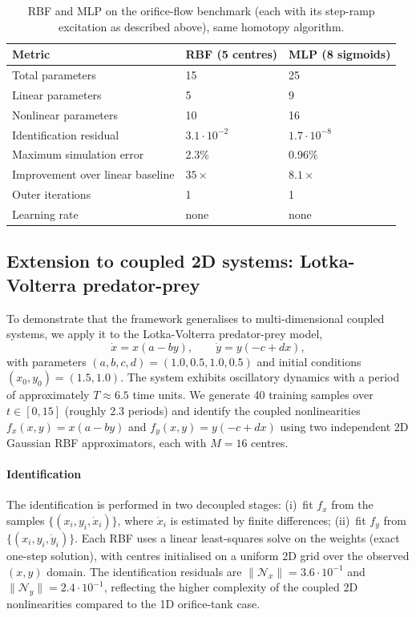 \documentclass[preprint,12pt,numbers]{elsarticle}
\begin{document}
\begin{table}[h]
\centering
\caption{RBF and MLP on the orifice-flow benchmark (each with its
step-ramp excitation as described above), same homotopy algorithm.}
\label{tab:comparison}
\begin{tabular}{L{5cm} C{3.5cm} C{3.5cm}}
\toprule
\textbf{Metric} & \textbf{RBF (5 centres)} & \textbf{MLP (8 sigmoids)} \\
\midrule
Total parameters & 15 & 25 \\
Linear parameters & 5 & 9 \\
Nonlinear parameters & 10 & 16 \\
Identification residual & $3.1\cdot 10^{-2}$ & $1.7\cdot 10^{-8}$ \\
Maximum simulation error & 2.3\% & 0.96\% \\
Improvement over linear baseline & $35\times$ & $8.1\times$ \\
Outer iterations & 1 & 1 \\
Learning rate & none & none \\
\bottomrule
\end{tabular}
\end{table}

\subsection{Extension to coupled 2D systems: Lotka-Volterra predator-prey}

To demonstrate that the framework generalises to multi-dimensional coupled
systems, we apply it to the Lotka-Volterra predator-prey model,
\begin{equation}
\dot{x} = x(a - by), \qquad \dot{y} = y(-c + dx),
\label{eq:lotka-volterra}
\end{equation}
with parameters $(a, b, c, d) = (1.0, 0.5, 1.0, 0.5)$ and initial conditions
$(x_0, y_0) = (1.5, 1.0)$. The system exhibits oscillatory dynamics with a
period of approximately $T \approx 6.5$ time units. We generate 40 training
samples over $t \in [0, 15]$ (roughly 2.3 periods) and identify the coupled
nonlinearities $f_x(x, y) = x(a - by)$ and $f_y(x, y) = y(-c + dx)$ using
two independent 2D Gaussian RBF approximators, each with $M = 16$ centres.

\paragraph{Identification} The identification is performed in two decoupled
stages: (i)~fit $f_x$ from the samples $\{(x_i, y_i, \dot{x}_i)\}$, where
$\dot{x}_i$ is estimated by finite differences; (ii)~fit $f_y$ from
$\{(x_i, y_i, \dot{y}_i)\}$. Each RBF uses a linear least-squares solve on
the weights (exact one-step solution), with centres initialised on a uniform
2D grid over the observed $(x, y)$ domain. The identification residuals are
$\|\mathcal{N}_x\| = 3.6\cdot 10^{-1}$ and $\|\mathcal{N}_y\| = 2.4\cdot 10^{-1}$,
reflecting the higher complexity of the coupled 2D nonlinearities compared to
the 1D orifice-tank case.
\end{document}
